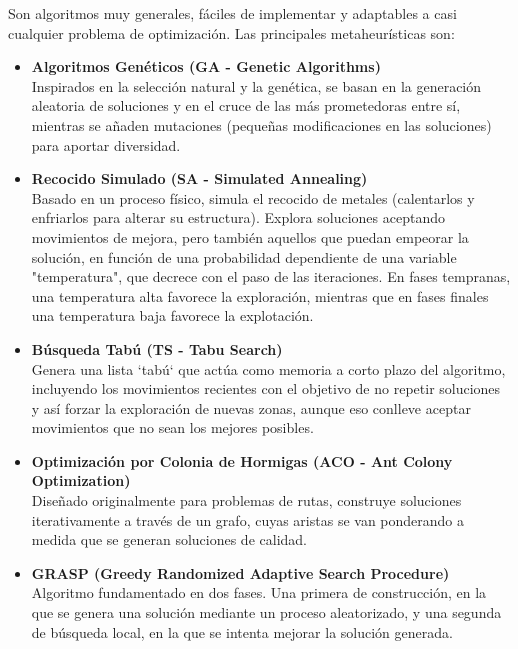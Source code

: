 \documentclass[12pt,a4paper]{book}
\begin{document}
Son algoritmos muy generales, fáciles de implementar y adaptables a casi 
cualquier problema de optimización. Las principales metaheurísticas son:
\begin{itemize}
    \item \textbf{Algoritmos Genéticos (GA - Genetic Algorithms)}\\
    Inspirados en la selección natural y la genética, se basan en la generación aleatoria de soluciones y en el cruce de las más prometedoras entre sí, 
    mientras se añaden mutaciones (pequeñas modificaciones en las soluciones) para aportar diversidad.
    
    \item \textbf{Recocido Simulado (SA - Simulated Annealing)}\\
    Basado en un proceso físico, simula el recocido de metales (calentarlos y enfriarlos para alterar su estructura). Explora soluciones aceptando movimientos de mejora, pero también aquellos que puedan empeorar la solución, 
    en función de una probabilidad dependiente de una variable "temperatura", que decrece con el paso de las iteraciones. En fases tempranas, una temperatura alta favorece la exploración, mientras que en fases finales una temperatura baja favorece la explotación.
    
    \item \textbf{Búsqueda Tabú (TS - Tabu Search)}\\
    Genera una lista `tabú` que actúa como memoria a corto plazo del algoritmo, incluyendo los movimientos recientes con el objetivo de no repetir soluciones y así forzar la exploración de nuevas zonas, aunque eso conlleve aceptar movimientos que no sean los mejores posibles.
    
    \item \textbf{Optimización por Colonia de Hormigas (ACO - Ant Colony Optimization)}\\
    Diseñado originalmente para problemas de rutas, construye soluciones iterativamente a través de un grafo, cuyas aristas se van ponderando a medida que se generan soluciones de calidad.
    
    \item \textbf{GRASP (Greedy Randomized Adaptive Search Procedure)}\\
    Algoritmo fundamentado en dos fases. Una primera de construcción, en la que se genera una solución mediante un proceso aleatorizado, y una segunda de búsqueda local, en la que se intenta mejorar la solución generada.
\end{itemize}
\end{document}

